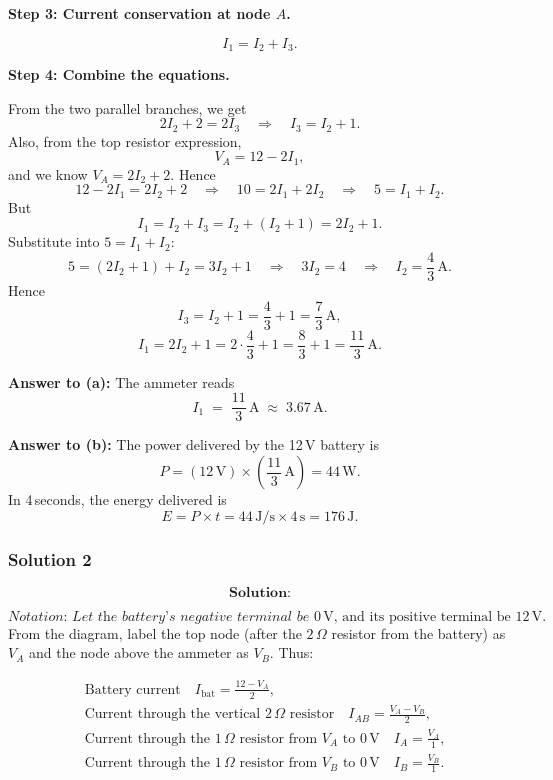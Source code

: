 \documentclass{article}
\begin{document}
\textbf{Step 3: Current conservation at node \(A\).}

\[
I_1 = I_2 + I_3.
\]

\textbf{Step 4: Combine the equations.}

From the two parallel branches, we get
\[
2I_2 + 2 = 2I_3
\quad\Longrightarrow\quad
I_3 = I_2 + 1.
\]
Also, from the top resistor expression,
\[
V_A = 12 - 2I_1,
\]
and we know \(V_A = 2I_2 + 2\). Hence
\[
12 - 2I_1 = 2I_2 + 2
\quad\Longrightarrow\quad
10 = 2I_1 + 2I_2
\quad\Longrightarrow\quad
5 = I_1 + I_2.
\]
But
\[
I_1 = I_2 + I_3 = I_2 + (I_2 + 1) = 2I_2 + 1.
\]
Substitute into \(5 = I_1 + I_2\):
\[
5 = (2I_2 + 1) + I_2 = 3I_2 + 1 
\quad\Longrightarrow\quad
3I_2 = 4
\quad\Longrightarrow\quad
I_2 = \frac{4}{3}\,\mathrm{A}.
\]
Hence
\[
I_3 = I_2 + 1 = \frac{4}{3} + 1 = \frac{7}{3}\,\mathrm{A},
\]
\[
I_1 = 2I_2 + 1 = 2\cdot\frac{4}{3} + 1 = \frac{8}{3} + 1 = \frac{11}{3}\,\mathrm{A}.
\]

\textbf{Answer to (a):} The ammeter reads
\[
I_1 \;=\; \frac{11}{3}\,\mathrm{A}\;\approx\;3.67\,\mathrm{A}.
\]

\textbf{Answer to (b):} The power delivered by the 12 V battery is
\[
P = (12\,\mathrm{V}) \times \left(\frac{11}{3}\,\mathrm{A}\right)
= 44\,\mathrm{W}.
\]
In 4 seconds, the energy delivered is
\[
E = P \times t = 44\,\mathrm{J/s} \times 4\,\mathrm{s} = 176\,\mathrm{J}.
\]

\subsubsection{Solution 2}
\[
\textbf{Solution:}
\]

\[
\textit{Notation: Let the battery’s negative terminal be }0\,\mathrm{V},\,
\text{and its positive terminal be }12\,\mathrm{V}.
\]
From the diagram, label the top node (after the \(2\,\Omega\) resistor from the battery) as \(V_A\) and the node above the ammeter as \(V_B\). Thus:

\[
\begin{aligned}
&\text{Battery current} \quad I_{\text{bat}} = \frac{12 - V_A}{2},\\
&\text{Current through the vertical }2\,\Omega\text{ resistor} \quad I_{AB} = \frac{V_A - V_B}{2},\\
&\text{Current through the }1\,\Omega\text{ resistor from }V_A \text{ to }0\,\mathrm{V} \quad I_A = \frac{V_A}{1},\\
&\text{Current through the }1\,\Omega\text{ resistor from }V_B \text{ to }0\,\mathrm{V} \quad I_B = \frac{V_B}{1}.
\end{aligned}
\]
\end{document}
